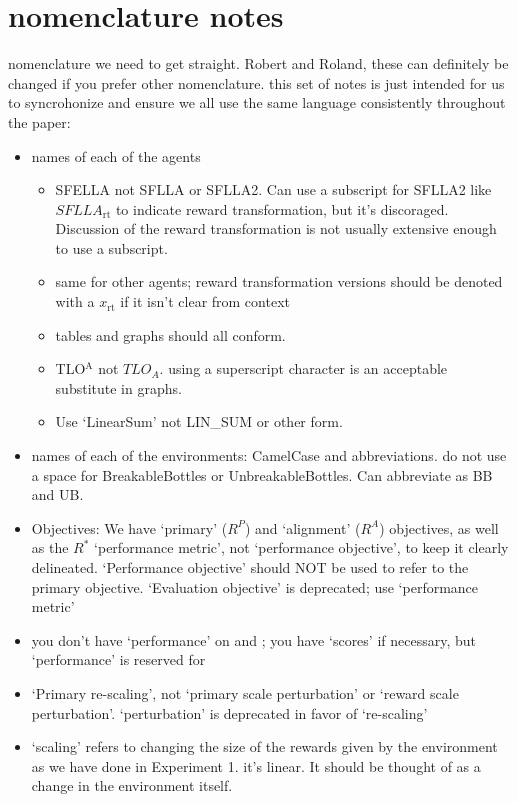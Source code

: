 \section*{nomenclature notes}
nomenclature we need to get straight. Robert and Roland, these can definitely be changed if you prefer other nomenclature. this set of notes is just intended for us to syncrohonize and ensure we all use the same language consistently throughout the paper:

\begin{itemize}
    \item names of each of the agents
        \begin{itemize}
            \item SFELLA not SFLLA or SFLLA2. Can use a subscript for SFLLA2 like $SFLLA_{\text{rt}}$ to indicate reward transformation, but it's discoraged. Discussion of the reward transformation is not usually extensive enough to use a subscript. 
            \item same for other agents; reward transformation versions should be denoted with a $x_{\text{rt}}$ if it isn't clear from context
            \item tables and graphs should all conform.
            \item TLO$^\text{A}$ not $TLO_A$. using a superscript character is an acceptable substitute in graphs.
            \item Use `LinearSum' not LIN\_SUM or other form.
        \end{itemize}
    \item names of each of the environments: CamelCase and abbreviations. do not use a space for BreakableBottles or UnbreakableBottles. Can abbreviate as BB and UB. 
    \item Objectives: We have `primary' ($R^P$) and `alignment' ($R^A$) objectives, as well as the $R^*$ `performance metric', not `performance objective', to keep it clearly delineated. `Performance objective' should NOT be used to refer to the primary objective. `Evaluation objective' is deprecated; use `performance metric'
    \item you don't have `performance' on \RA{} and \RP{}; you have `scores' if necessary, but `performance' is reserved for \RStar{}
    \item `Primary re-scaling', not `primary scale perturbation' or `reward scale perturbation'. `perturbation' is deprecated in favor of `re-scaling'
    \item `scaling' refers to changing the size of the rewards given by the environment as we have done in Experiment 1. it's linear. It should be thought of as a change in the environment itself.

\end{itemize}
